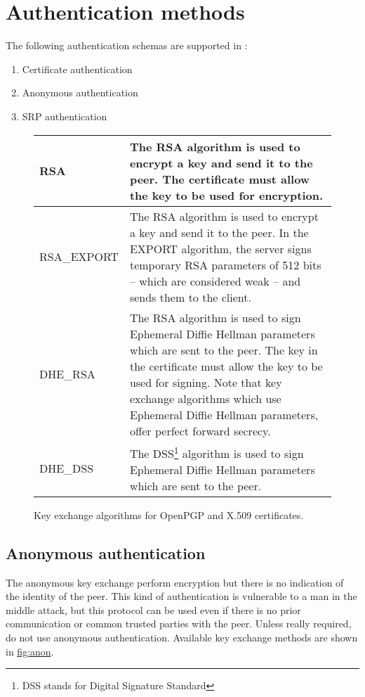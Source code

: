 \chapter{Authentication methods}
\par
The following authentication schemas are supported in \gnutls:
\begin{enumerate}
 \item Certificate authentication
 \item Anonymous authentication
 \item SRP authentication
\end{enumerate}



\begin{figure}[hbtp]
\begin{tabular}{|l|p{9cm}|}
\hline
RSA & The RSA algorithm is used to encrypt a key and send it to the peer.
The certificate must allow the key to be used for encryption.
\\
\hline
RSA\_EXPORT & The RSA algorithm is used to encrypt a key and send it to the peer.
In the EXPORT algorithm, the server signs temporary RSA parameters of 512
bits -- which are considered weak -- and sends them to the client.
\\
\hline
DHE\_RSA & The RSA algorithm is used to sign Ephemeral Diffie Hellman
parameters which are sent to the peer. The key in the certificate must allow
the key to be used for signing. Note that key exchange algorithms which use
Ephemeral Diffie Hellman parameters, offer perfect forward secrecy.
\\
\hline
DHE\_DSS & The DSS\footnote{DSS stands for Digital Signature Standard} algorithm is used to sign Ephemeral Diffie Hellman
parameters which are sent to the peer. 
\\
\hline
\end{tabular}

\caption{Key exchange algorithms for OpenPGP and X.509 certificates.}
\label{fig:cert}

\end{figure}







\section{Anonymous authentication}
The anonymous key exchange perform encryption but there is no indication of 
the identity of the peer. This kind of authentication is vulnerable to a
man in the middle attack, 
but this protocol can be used even if there is no prior communication or common trusted
parties with the peer. Unless really required, do not use anonymous authentication.
Available key exchange methods are shown in \hyperref{figure}{figure }{}{fig:anon}.

